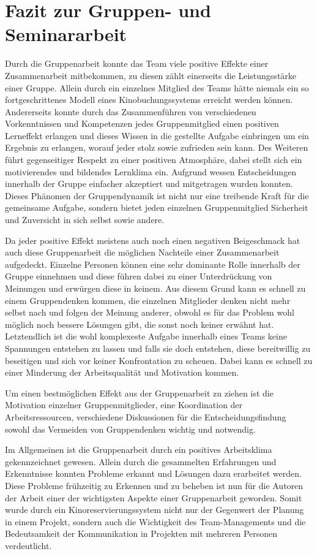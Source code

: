 \section{Fazit zur Gruppen- und Seminararbeit}
\multipleauthorsection{\authorRF}{\authorEJ}

Durch die Gruppenarbeit konnte das Team viele positive Effekte einer Zusammenarbeit mitbekommen, zu diesen zählt einerseits die Leistungsstärke einer Gruppe.
Allein durch ein einzelnes Mitglied des Teams hätte niemals ein so fortgeschrittenes Modell eines Kinobuchungssystems erreicht werden können.
Andererseits konnte durch das Zusammenführen von verschiedenen Vorkenntnissen und Kompetenzen jedes Gruppenmitglied einen positiven Lerneffekt erlangen und dieses Wissen in die gestellte Aufgabe einbringen um ein Ergebnis zu erlangen, worauf jeder stolz sowie zufrieden sein kann.
Des Weiteren führt gegenseitiger Respekt zu einer positiven Atmosphäre, dabei stellt sich ein motivierendes und bildendes Lernklima ein.
Aufgrund wessen Entscheidungen innerhalb der Gruppe einfacher akzeptiert und mitgetragen wurden konnten.
Dieses Phänomen der Gruppendynamik ist nicht nur eine treibende Kraft für die gemeinsame Aufgabe, sondern bietet jeden einzelnen Gruppenmitglied Sicherheit und Zuversicht in sich selbst sowie andere.

Da jeder positive Effekt meistens auch noch einen negativen Beigeschmack hat auch diese Gruppenarbeit die möglichen Nachteile einer Zusammenarbeit aufgedeckt.
Einzelne Personen können eine sehr dominante Rolle innerhalb der Gruppe einnehmen und diese führen dabei zu einer Unterdrückung von Meinungen und erwürgen diese in keinem. 
Aus diesem Grund kann es schnell zu einem Gruppendenken kommen, die einzelnen Mitglieder denken nicht mehr selbst nach und folgen der Meinung anderer, obwohl es für das Problem wohl möglich noch bessere Lösungen gibt, die sonst noch keiner erwähnt hat.
Letztendlich ist die wohl komplexeste Aufgabe innerhalb eines Teams keine Spannungen entstehen zu lassen und falls sie doch entstehen, diese bereitwillig zu beseitigen und sich vor keiner Konfrontation zu scheuen.
Dabei kann es schnell zu einer Minderung der Arbeitsqualität und Motivation kommen. 

Um einen bestmöglichen Effekt aus der Gruppenarbeit zu ziehen ist die Motivation einzelner Gruppenmitglieder, eine Koordination der Arbeitsressourcen, verschiedene Diskussionen für die Entscheidungsfindung sowohl das Vermeiden von Gruppendenken wichtig und notwendig.


Im Allgemeinen ist die Gruppenarbeit durch ein positives Arbeitsklima gekennzeichnet gewesen.
Allein durch die gesammelten Erfahrungen und Erkenntnisse konnten Probleme erkannt und Lösungen dazu erarbeitet werden.
Diese Probleme frühzeitig zu Erkennen und zu beheben ist nun für die Autoren der Arbeit einer der wichtigsten Aspekte einer Gruppenarbeit geworden.
Somit wurde durch ein Kinoreservierungssystem nicht nur der Gegenwert der Planung in einem Projekt, sondern auch die Wichtigkeit des Team-Managements und die Bedeutsamkeit der Kommunikation in Projekten mit mehreren Personen verdeutlicht.

